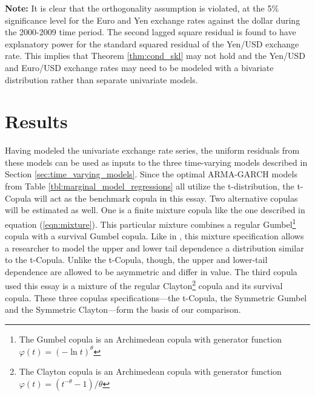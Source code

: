 \begin{table}
\begin{threeparttable}
\begin{tablenotes}
			\item{\footnotesize \textbf{Note:} It is clear that the orthogonality assumption is violated, at the 5\% significance level for the Euro and Yen exchange rates against the dollar during the 2000-2009 time period. The second lagged square residual is found to have explanatory power for the standard squared residual of the Yen/USD exchange rate. This implies that Theorem \ref{thm:cond_skl} may not hold and the Yen/USD and Euro/USD exchange rates may need to be modeled with a bivariate distribution rather than separate univariate models.}
		\end{tablenotes}
	\end{threeparttable}
\end{table}

\section{Results} \label{sec:Results}

Having modeled the univariate exchange rate series, the uniform residuals from these models can be used as inputs to the three time-varying models described in Section \ref{sec:time_varying_models}. Since the optimal ARMA-GARCH models from Table \ref{tbl:marginal_model_regressions} all utilize the t-distribution, the t-Copula will act as the benchmark copula in this essay. Two alternative copulas will be estimated as well. One is a finite mixture copula like the one described in equation (\ref{eqn:mixture}). This particular mixture combines a regular Gumbel\footnote{The Gumbel copula is an Archimedean copula with generator function $\varphi\left(t\right) = \left(-\ln t\right)^{\theta}$} copula with a survival Gumbel copula. Like in \cite{Patton_2006}, this mixture specification allows a researcher to model the upper and lower tail dependence a distribution similar to the t-Copula. Unlike the t-Copula, though, the upper and lower-tail dependence are allowed to be asymmetric and differ in value. The third copula used this essay is a mixture of the regular Clayton\footnote{The Clayton copula is an Archimedean copula with generator function $\varphi\left(t\right) = (t^{-\theta} - 1) / \theta$} copula and its survival copula. These three copulas specifications---the t-Copula, the Symmetric Gumbel and the Symmetric Clayton---form the basis of our comparison. 

